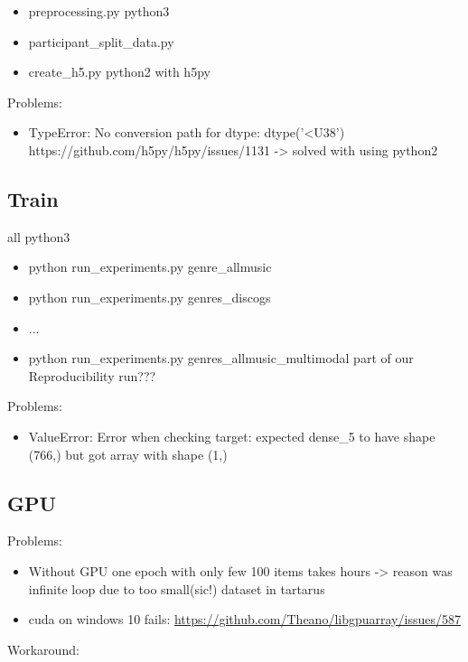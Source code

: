 \documentclass[sigconf,nonacm]{acmart}
\begin{document}
  \begin{itemize}
    \item preprocessing.py python3
    \item participant\_split\_data.py
    \item create\_h5.py python2 with h5py
  \end{itemize}

  Problems:
  \begin{itemize}
    \item TypeError: No conversion path for dtype: dtype('<U38') https://github.com/h5py/h5py/issues/1131 -> solved with using python2
  \end{itemize}

\subsection{Train}

all python3

\begin{itemize}
  \item python run\_experiments.py genre\_allmusic
  \item python run\_experiments.py genres\_discogs
  \item ... 
  \item python run\_experiments.py genres\_allmusic\_multimodal part of our Reproducibility run???
\end{itemize}

Problems:
\begin{itemize}
  \item ValueError: Error when checking target: expected dense\_5 to have shape (766,) but got array with shape (1,)
\end{itemize}

\subsection{GPU}

Problems:

\begin{itemize}
  \item Without GPU one epoch with only few 100 items takes hours -> reason was infinite loop due to too small(sic!) dataset in tartarus
  \item cuda on windows 10 fails: \url{https://github.com/Theano/libgpuarray/issues/587}
\end{itemize}

Workaround:
\end{document}
